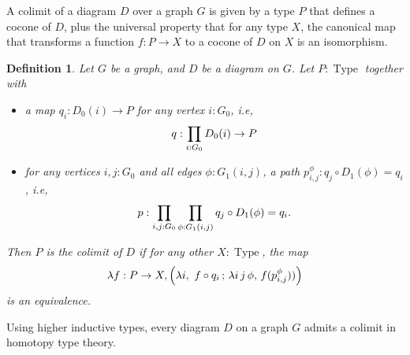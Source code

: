 \documentclass[preprint,9pt,numbers]{sigplanconf}
\newtheorem{defi}[thm]{Definition}
\newcommand{\ie}{i.e,\xspace}
\DeclareMathOperator{\Type}{Type}
\DeclareMathOperator{\precompose}{\mathrm{precompose}}
\newenvironment{mymath}[1][-0em]{%
  \newcommand\mymathaux{\vspace{#1}}%
  \vspace{#1}%
  \begin{equation*}%
  }{ %
    \mymathaux%
  \end{equation*}}
\begin{document}


A colimit of a diagram $D$ over a graph $G$ is given by a type $P$
that defines a cocone of $D$, plus the universal property that for any
type $X$, the canonical map that transforms a function $f : P
\rightarrow X$ to a cocone of $D$ on $X$ is an isomorphism.
% 
\begin{defi}\label{def:colimit}
Let $G$ be a graph, and $D$ be a diagram on $G$. 
Let $P:\Type$ together with
\begin{itemize}
\item a map $q_i : D_0(i) \to P$ for any
vertex $i:G_0$, \ie \begin{mymath}[0em]q : \prod_{i:G_0} D_0(i) \to P\end{mymath}%
\item for any vertices $i,j:G_0$ and all edges $\phi:G_1(i,j)$, a path
  $p_{i,j}^\phi : q_j \circ D_1(\phi) = q_i$, \ie
  \begin{mymath}[0em]p : \prod_{i,j:G_0} \prod_{\phi:G_1(i,j)} q_j \circ D_1(\phi) = q_i.\end{mymath}%
\end{itemize}

Then $P$ is the {\em colimit} of $D$ if for any other $X:\Type$, the
map
\begin{mymath}\lambda f:P \to X, \left( \lambda i,~f \circ q_i\, ;\, \lambda i\, j\,
  \phi,\, f (p_{i, j}^\phi)) \right)\end{mymath}%
is an equivalence.
\end{defi}
Using higher inductive types, every diagram $D$ on a graph $G$ admits a
colimit in homotopy type theory. 
\end{document}
